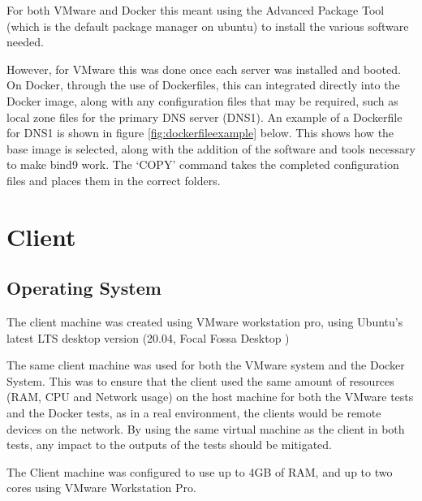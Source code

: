 For both VMware and Docker this meant using the Advanced Package Tool (which is the default package manager on ubuntu) to install the various software needed.

However, for VMware this was done once each server was installed and booted. On Docker, through the use of Dockerfiles, this can integrated directly into the Docker image, along with any configuration files that may be required, such as local zone files for the primary DNS server (DNS1). An example of a Dockerfile for DNS1 is shown in figure \ref{fig:dockerfileexample} below. This shows how the base image is selected, along with the addition of the software and tools necessary to make bind9 work. The `COPY' command takes the completed configuration files and places them in the correct folders.
%
%
%
%
%
%

\section{Client}
\subsection{Operating System}
\label{ClientOS}
The client machine was created using VMware workstation pro, using Ubuntu's latest LTS desktop version (20.04, Focal Fossa Desktop \citep{UbuntuDesktopDocumentation})

The same client machine was used for both the VMware system and the Docker System. This was to ensure that the client used the same amount of resources (RAM, CPU and Network usage) on the host machine for both the VMware tests and the Docker tests, as in a real environment, the clients would be remote devices on the network. By using the same virtual machine as the client in both tests, any impact to the outputs of the tests should be mitigated.

The Client machine was configured to use up to 4GB of RAM, and up to two cores using VMware Workstation Pro.

